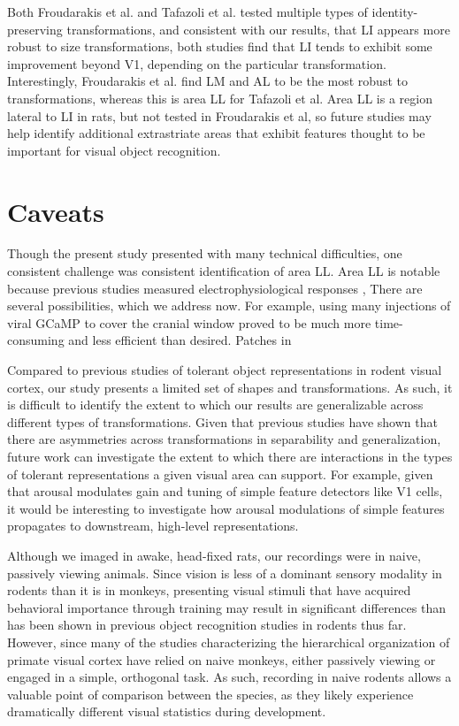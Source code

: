 Both Froudarakis et al. and Tafazoli et al. tested multiple types of identity-preserving transformations, and consistent with our results, that LI appears more robust to size transformations, both studies find that LI tends to exhibit some improvement beyond V1, depending on the particular transformation. Interestingly, Froudarakis et al. find LM and AL to be the most robust to transformations, whereas this is area LL for Tafazoli et al. Area LL is a region lateral to LI in rats, but not tested in Froudarakis et al, so future studies may help identify additional extrastriate areas that exhibit features thought to be important for visual object recognition.  

\section{Caveats}
Though the present study presented with many technical difficulties, one consistent challenge was consistent identification of area LL. Area LL is notable because previous studies measured electrophysiological responses , There are several possibilities, which we address now. For example, using many injections of viral GCaMP to cover the cranial window proved to be much more time-consuming and less efficient than desired. Patches in 

Compared to previous studies of tolerant object representations in rodent visual cortex, our study presents a limited set of shapes and transformations. As such, it is difficult to identify the extent to which our results are generalizable across different types of transformations. Given that previous studies have shown that there are asymmetries across transformations in separability and generalization, future work can investigate the extent to which there are interactions in the types of tolerant representations a given visual area can support. For example, given that arousal modulates gain and tuning of simple feature detectors like V1 cells, it would be interesting to investigate how arousal modulations of simple features propagates to downstream, high-level representations.

Although we imaged in awake, head-fixed rats, our recordings were in naive, passively viewing animals. Since vision is less of a dominant sensory modality in rodents than it is in monkeys, presenting visual stimuli that have acquired behavioral importance through training may result in significant differences than has been shown in previous object recognition studies in rodents thus far. However, since many of the studies characterizing the hierarchical organization of primate visual cortex have relied on naive monkeys, either passively viewing or engaged in a simple, orthogonal task. As such, recording in naive rodents allows a valuable point of comparison between the species, as they likely experience dramatically different visual statistics during development.


